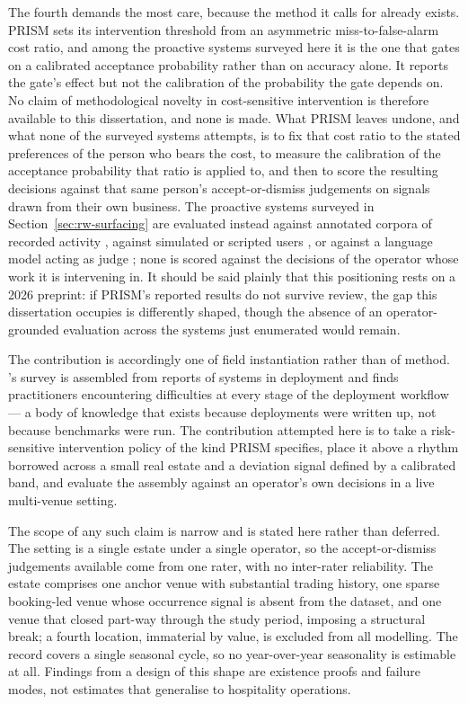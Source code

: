 The fourth demands the most care, because the method it calls for already
exists. PRISM \citep{fu_prism_2026} sets its intervention threshold from an
asymmetric miss-to-false-alarm cost ratio, and among the proactive systems
surveyed here it is the one that gates on a calibrated acceptance probability
rather than on accuracy alone. It reports the gate's effect but not the
calibration of the probability the gate depends on. No claim of methodological
novelty in cost-sensitive intervention is therefore available to this
dissertation, and none is made. What PRISM leaves undone, and what none of the
surveyed systems attempts, is to fix that cost ratio to the stated preferences
of the person who bears the cost, to measure the calibration of the acceptance
probability that ratio is applied to, and then to score the resulting decisions
against that same person's accept-or-dismiss judgements on signals drawn from
their own business. The proactive systems surveyed in
Section~\ref{sec:rw-surfacing} are evaluated instead against annotated corpora
of recorded activity \citep{lu_proactive_2024,tang_proagentbench_2026}, against
simulated or scripted users
\citep{yao_-bench_2024,liu_proactiveeval_2025,gulati_ask_2026}, or against a
language model acting as judge \citep{fu_prism_2026,ding_proactor_2026}; none
is scored against the decisions of the operator whose work it is intervening
in. It should be said plainly that this positioning rests on a 2026 preprint: if
PRISM's reported results do not survive review, the gap this dissertation
occupies is differently shaped, though the absence of an operator-grounded
evaluation across the systems just enumerated would remain.

The contribution is accordingly one of field instantiation rather than of
method. \citet{paleyes_challenges_2022}'s survey is assembled from reports of
systems in deployment and finds practitioners encountering difficulties at
every stage of the deployment workflow --- a body of knowledge that exists
because deployments were written up, not because benchmarks were run. The
contribution attempted here is to take a risk-sensitive intervention policy of
the kind PRISM specifies, place it above a rhythm borrowed across a small real
estate and a deviation signal defined by a calibrated band, and evaluate the
assembly against an operator's own decisions in a live multi-venue setting.

The scope of any such claim is narrow and is stated here rather than deferred.
The setting is a single estate under a single operator, so the accept-or-dismiss
judgements available come from one rater, with no inter-rater reliability. The
estate comprises one anchor venue with substantial trading history, one sparse
booking-led venue whose occurrence signal is absent from the dataset, and one
venue that closed part-way through the study period, imposing a structural
break; a fourth location, immaterial by value, is excluded from all modelling.
The record covers a single seasonal cycle, so no year-over-year seasonality is
estimable at all. Findings from a design of this shape are existence proofs and
failure modes, not estimates that generalise to hospitality operations.

